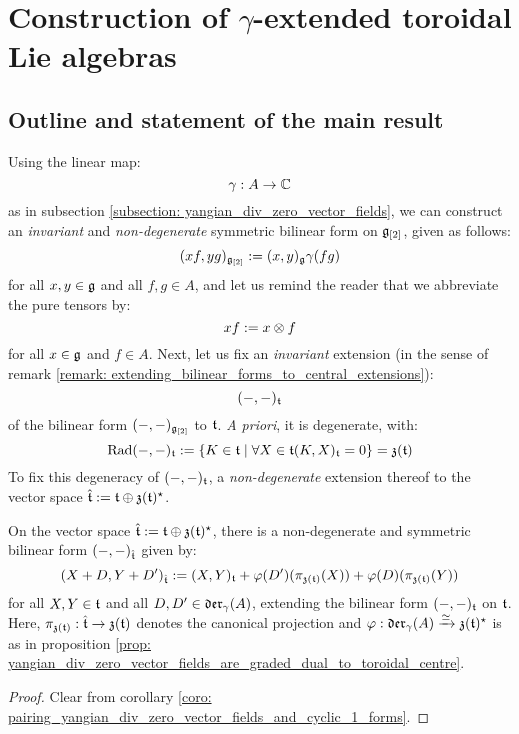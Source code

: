 \section{Construction of \texorpdfstring{$\gamma$}{}-extended toroidal Lie algebras}
    \subsection{Outline and statement of the main result}
        Using the linear map:
            $$\gamma: A \to \mathbb{C}$$
        as in subsection \ref{subsection: yangian_div_zero_vector_fields}, we can construct an \textit{invariant} and \textit{non-degenerate} symmetric bilinear form on $\mathfrak{g}_{[2]}$, given as follows:
            $$(xf, yg)_{\mathfrak{g}_{[2]}} := (x, y)_{\mathfrak{g}} \gamma(fg)$$
        for all $x, y \in \mathfrak{g}$ and all $f, g \in A$, and let us remind the reader that we abbreviate the pure tensors by:
            $$xf := x \tensor f$$
        for all $x \in \mathfrak{g}$ and $f \in A$. Next, let us fix an \textit{invariant} extension (in the sense of remark \ref{remark: extending_bilinear_forms_to_central_extensions}):
            $$(-, -)_{\mathfrak{t}}$$
        of the bilinear form $(-, -)_{\mathfrak{g}_{[2]}}$ to $\mathfrak{t}$. \textit{A priori}, it is degenerate, with:
            $$\operatorname{Rad}(-, -)_{\mathfrak{t}} := \{ K \in \mathfrak{t} \mid \forall X \in \mathfrak{t} (K, X)_{\mathfrak{t}} = 0 \} = \mathfrak{z}(\mathfrak{t})$$
        To fix this degeneracy of $(-, -)_{\mathfrak{t}}$, a \textit{non-degenerate} extension thereof to the vector space $\hat{\mathfrak{t}} := \mathfrak{t} \oplus \mathfrak{z}(\mathfrak{t})^{\star}$.
        \begin{proposition} \label{prop: extended_toroidal_bilinear_form}
            On the vector space $\hat{\mathfrak{t}} := \mathfrak{t} \oplus \mathfrak{z}(\mathfrak{t})^{\star}$, there is a non-degenerate and symmetric bilinear form $(-, -)_{\hat{\mathfrak{t}}}$ given by:
                $$( X + D, Y + D' )_{\hat{\mathfrak{t}}} := (X, Y)_{\mathfrak{t}} + \varphi(D')( \pi_{\mathfrak{z}(\mathfrak{t})}(X) ) + \varphi(D)( \pi_{\mathfrak{z}(\mathfrak{t})}(Y) )$$
            for all $X, Y \in \mathfrak{t}$ and all $D, D' \in \mathfrak{der}_{\gamma}(A)$, extending the bilinear form $(-, -)_{\mathfrak{t}}$ on $\mathfrak{t}$. Here, $\pi_{\mathfrak{z}(\mathfrak{t})}: \hat{\mathfrak{t}} \to \mathfrak{z}(\mathfrak{t})$ denotes the canonical projection and $\varphi: \mathfrak{der}_{\gamma}(A) \xrightarrow[]{\simeq} \mathfrak{z}(\mathfrak{t})^{\star}$ is as in proposition \ref{prop: yangian_div_zero_vector_fields_are_graded_dual_to_toroidal_centre}.
        \end{proposition}
            \begin{proof}
                Clear from corollary \ref{coro: pairing_yangian_div_zero_vector_fields_and_cyclic_1_forms}.
            \end{proof}


